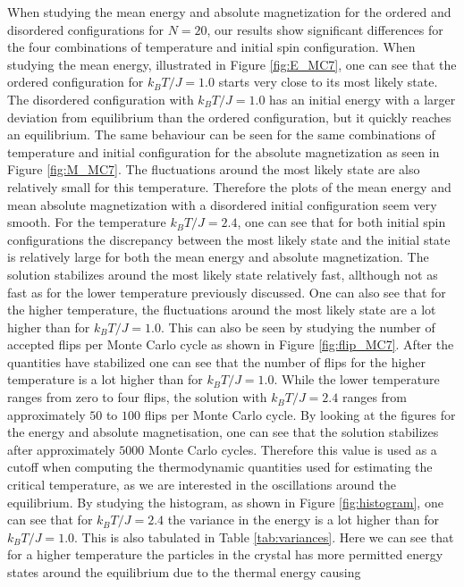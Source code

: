 \documentclass[twocolumn]{aastex62}
\begin{document}
When studying the mean energy and absolute magnetization for the ordered and
disordered configurations for $N=20$, our results show significant differences
for the four combinations of temperature and initial spin configuration. When
studying the mean energy, illustrated in Figure \ref{fig:E_MC7}, one can see
that the ordered configuration for $k_BT/J=1.0$ starts very close to its most
likely state. The disordered configuration with $k_BT/J=1.0$ has an initial
energy with a larger deviation from equilibrium than the ordered configuration,
but it quickly reaches an equilibrium. The same behaviour can be seen for the
same combinations of temperature and initial configuration for the absolute
magnetization as seen in Figure \ref{fig:M_MC7}. The fluctuations around the
most likely state are also relatively small for this temperature. Therefore the
plots of the mean energy and mean absolute magnetization with a disordered
initial configuration seem very smooth. For the temperature $k_BT/J=2.4$, one
can see that for both initial spin configurations the discrepancy between the
most likely state and the initial state is relatively large for both the mean
energy and absolute magnetization. The solution stabilizes around the most
likely state relatively fast, allthough not as fast as for the lower temperature
previously discussed. One can also see that for the higher temperature, the
fluctuations around the most likely state are a lot higher than for $k_BT/J
=1.0$. This can also be seen by studying the number of accepted flips per Monte
Carlo cycle as shown in Figure \ref{fig:flip_MC7}. After the quantities have
stabilized one can see that the number of flips for the higher temperature is a
lot higher than for $k_BT/J=1.0$. While the lower temperature ranges from zero
to four flips, the solution with $k_BT/J=2.4$ ranges from approximately $50$ to
$100$ flips per Monte Carlo cycle. By looking at the figures for the energy and
absolute magnetisation, one can see that the solution stabilizes after
approximately $5000$ Monte Carlo cycles. Therefore this value is used as a
cutoff when computing the thermodynamic quantities used for estimating the
critical temperature, as we are interested in the oscillations around the
equilibrium. By studying the histogram, as shown in Figure \ref{fig:histogram},
one can see that for $k_BT/J=2.4$ the variance in the energy is a lot higher
than for $k_BT/J=1.0$. This is also tabulated in Table \ref{tab:variances}. Here
we can see that for a higher temperature the particles in the crystal has more
permitted energy states around the equilibrium due to the thermal energy causing
\end{document}
